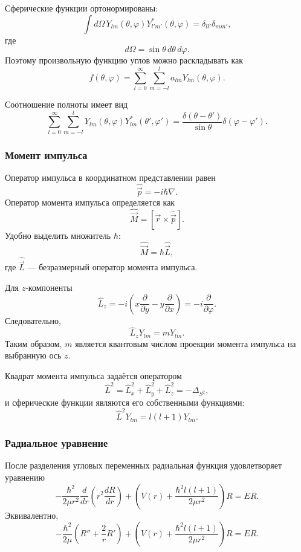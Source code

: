 \documentclass[12pt,a4paper]{article}
\begin{document}
Сферические функции ортонормированы:
\[
    \boxed{
    \int d\Omega\,
    Y_{lm}(\theta,\varphi)
    Y_{l'm'}^*(\theta,\varphi)
    =
    \delta_{ll'}\delta_{mm'}
    },
\]
где
\[
    d\Omega=\sin\theta\,d\theta\,d\varphi.
\]
Поэтому произвольную функцию углов можно раскладывать как
\[
    f(\theta,\varphi)
    =
    \sum_{l=0}^{\infty}
    \sum_{m=-l}^{l}
    a_{lm}Y_{lm}(\theta,\varphi).
\]

Соотношение полноты имеет вид
\[
    \boxed{
    \sum_{l=0}^{\infty}
    \sum_{m=-l}^{l}
    Y_{lm}(\theta,\varphi)
    Y_{lm}^*(\theta',\varphi')
    =
    \frac{\delta(\theta-\theta')}{\sin\theta}
    \delta(\varphi-\varphi')
    }.
\]

\subsubsection{Момент импульса}

Оператор импульса в координатном представлении равен
\[
    \hat{\vec p}=-i\hbar\nabla.
\]
Оператор момента импульса определяется как
\[
    \boxed{
        \hat{\vec M}
        =
        [\vec r\times\hat{\vec p}]
    }.
\]
Удобно выделить множитель $\hbar$:
\[
    \hat{\vec M}=\hbar\hat{\vec L},
\]
где $\hat{\vec L}$ --- безразмерный оператор момента импульса.

Для $z$-компоненты
\[
    \hat L_z
    =
    -i
    \left(
        x\frac{\partial}{\partial y}
        -
        y\frac{\partial}{\partial x}
    \right)
    =
    -i\frac{\partial}{\partial\varphi}.
\]
Следовательно,
\[
    \boxed{
        \hat L_zY_{lm}=mY_{lm}
    }.
\]
Таким образом, $m$ является квантовым числом проекции момента импульса
на выбранную ось $z$.

Квадрат момента импульса задаётся оператором
\[
    \hat L^2
    =
    \hat L_x^2+\hat L_y^2+\hat L_z^2
    =
    -\Delta_{S^2},
\]
и сферические функции являются его собственными функциями:
\[
    \boxed{
        \hat L^2Y_{lm}
        =
        l(l+1)Y_{lm}
    }.
\]

\subsubsection{Радиальное уравнение}

После разделения угловых переменных радиальная функция удовлетворяет
уравнению
\[
    \boxed{
    -\frac{\hbar^2}{2\mu r^2}
    \frac{d}{dr}
    \left(
        r^2\frac{dR}{dr}
    \right)
    +
    \left(
        V(r)+
        \frac{\hbar^2l(l+1)}{2\mu r^2}
    \right)R
    =
    ER
    }.
\]
Эквивалентно,
\[
    -\frac{\hbar^2}{2\mu}
    \left(
        R''+\frac{2}{r}R'
    \right)
    +
    \left(
        V(r)+
        \frac{\hbar^2l(l+1)}{2\mu r^2}
    \right)R
    =
    ER.
\]
\end{document}
